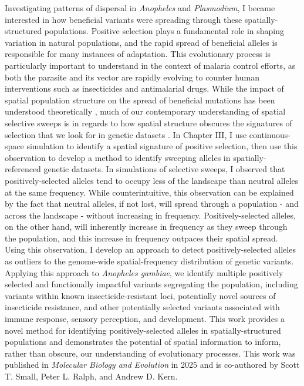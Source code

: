 Investigating patterns of dispersal in \textit{Anopheles} and \textit{Plasmodium}, I became interested in how beneficial variants
were spreading through these spatially-structured populations.
Positive selection plays a fundamental role in shaping variation in natural populations, and the 
rapid spread of beneficial alleles is responsible for many instances of adaptation.
This evolutionary process is particularly important to understand in the context of malaria control efforts, as both the parasite
and its vector are rapidly evolving to counter human interventions such as insecticides and antimalarial drugs.
While the impact of spatial population structure on the spread of beneficial mutations has been understood theoretically \citep{fisher_wave_1937},
much of our contemporary understanding of spatial selective sweeps is in regards to how spatial structure obscures 
the signatures of selection that we look for in genetic datasets \citep{chotai_signatures_2024, Min_Gupta_Desai_Weissman_2022}.
In Chapter III, I use continuous-space simulation to identify a spatial signature of positive selection, then use this
observation to develop a method to identify sweeping alleles in spatially-referenced genetic datasets. 
In simulations of selective sweeps, I observed that positively-selected alleles tend to occupy less of the landscape than
neutral alleles at the same frequency. 
While counterintuitive, this observation can be explained by the fact that neutral alleles, if not lost,  
will spread through a population - and across the landscape - without increasing in frequency.
Positively-selected alleles, on the other hand, will inherently increase in frequency as they sweep through the population, and this 
increase in frequency outpaces their spatial spread. 
Using this observation, I develop an approach to detect positively-selected alleles as outliers to the 
genome-wide spatial-frequency distribution of genetic variants.
Applying this approach to \textit{Anopheles gambiae}, we identify multiple positively selected and functionally impactful 
variants segregating the population, including variants within known insecticide-resistant loci, 
potentially novel sources of insecticide resistance, and other potentially selected variants
associated with immune response, sensory perception, and development.
This work provides a novel method for identifying positively-selected alleles in spatially-structured populations and demonstrates
the potential of spatial information to inform, rather than obscure, our understanding of evolutionary processes.
This work was published in \textit{Molecular Biology and Evolution} in 2025 and is co-authored by Scott T. Small, Peter L. Ralph, and Andrew D. Kern.

